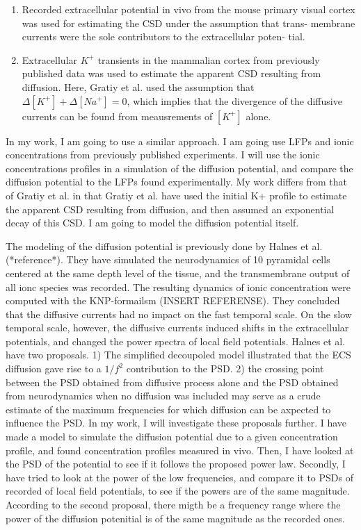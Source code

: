 \documentclass{article}
\begin{document}
\begin{enumerate}
\item  Recorded extracellular potential in vivo from the
mouse primary visual cortex was used for estimating the CSD under the assumption that trans-
membrane currents were the sole contributors to the extracellular poten-
tial.
\item Extracellular $K^+$ transients in the mammalian cortex from previously published data was used to estimate the apparent CSD resulting from diffusion. Here, Gratiy et al. used the assumption that $\Delta [K^+] + \Delta [Na^+] = 0$, which implies that the divergence of the diffusive currents can be found from meausrements of $[K^+]$ alone.
\end{enumerate}

In my work, I am going to use a similar approach. I am going use LFPs and ionic concentrations from previously published experiments. I will use the ionic concentrations profiles in a simulation of the diffusion potential, and compare the diffusion potential to the LFPs found experimentally. My work differs from that of Gratiy et al. in that Gratiy et al. have used the initial K+ profile to estimate the apparent CSD resulting from diffusion, and then assumed an exponential decay of this CSD. I am going to model the diffusion potential itself. 

The modeling of the diffusion potential is previously done by Halnes et al. (*reference*). They have simulated the neurodynamics of 10 pyramidal cells centered at the same depth level of the tissue, and the transmembrane output of all ionc species was recorded. The resulting dynamics of ionic concentration were computed with the KNP-formailsm (INSERT REFERENSE). They concluded that the diffusive currents had no impact on the fast temporal scale. On the slow temporal scale, however, the diffusive currents induced shifts in the extracellular potentials, and changed the power spectra of local field potentials. Halnes et al. have two proposals. 1) The simplified decoupoled model illustrated that the ECS diffusion gave rise to a $1/f^2$ contribution to the PSD. 2) the crossing point between the PSD obtained from diffusive process alone and the PSD obtained from neurodynamics when no diffusion was included may serve as a crude estimate of the maximum frequencies for which diffusion can be axpected to influence the PSD. In my work, I will investigate these proposals further. I  have made a model to simulate the diffusion potential due to a given concentration profile, and found concentration profiles measured in vivo. Then, I have looked at the PSD of the potential to see if it follows the proposed power law. Secondly, I have tried to look at the power of the low frequencies, and compare it to PSDs of recorded of local field potentials, to see if the powers are of the same magnitude. According to the second proposal, there migth be a frequency range where the power of the diffusion potenitial is of the same magnitude as the recorded ones. 
\end{document}
